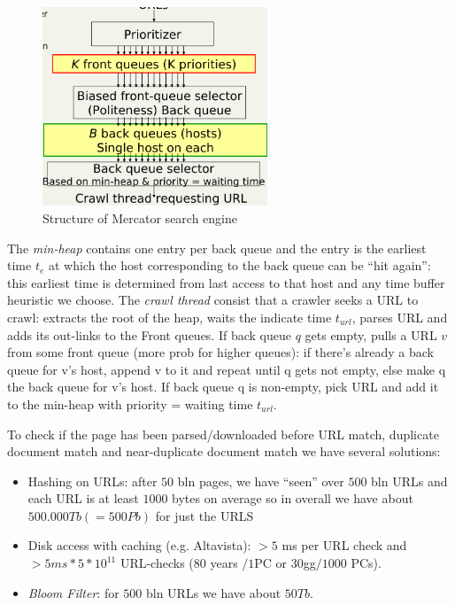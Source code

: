 \begin{figure}
    \includegraphics[width=0.6\textwidth]{Images/mercator}
    \caption{Structure of Mercator search engine}
    \label{img:mercator}
\end{figure}
The \emph{min-heap} contains one entry per back queue and the entry is the earliest time $t_e$ at which the host corresponding to the back queue can be “hit again”:
this earliest time is determined from last access to that host and any time buffer heuristic we choose.\newline
The \emph{crawl thread} consist that a crawler seeks a URL to crawl: extracts the root of the heap, waits the indicate time $t_{url}$, parses URL and adds its out-links to the Front queues.\newline
If back queue $q$ gets empty, pulls a URL $v$ from some front queue (more prob for higher queues): if there’s already a back queue for v’s host, append v to it and 
repeat until q gets not empty, else make q the back queue for v’s host.\newline
If back queue q is non-empty, pick URL and add it to the min-heap with priority = waiting time $t_{url}$.

To check if the page has been parsed/downloaded before URL match, duplicate document match and near-duplicate document match we have several solutions:
\begin{itemize}
    \item Hashing on URLs: after $50$ bln pages, we have “seen” over $500$ bln URLs and each URL is at least $1000$ bytes on average so in overall we have about $500.000 Tb (=500 Pb)$ for just the URLS
    \item Disk access with caching (e.g. Altavista): $>5$ ms per URL check and $>5 ms * 5 * 10^{11}$ URL-checks ($80$ years $/1$PC or $30$gg$/1000$ PCs).
    \item \emph{Bloom Filter}: for $500$ bln URLs we have about $50Tb$.
\end{itemize}

